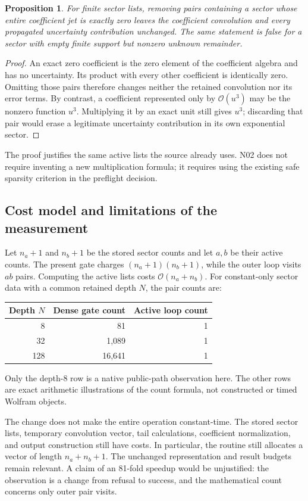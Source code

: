 \documentclass[11pt,a4paper]{article}
\newcommand{\OO}{\mathcal O}
\newtheorem{proposition}{Proposition}[section]
\begin{document}
\begin{proposition}
For finite sector lists, removing pairs containing a sector whose entire coefficient jet is exactly zero leaves the coefficient convolution and every propagated uncertainty contribution unchanged. The same statement is false for a sector with empty finite support but nonzero unknown remainder.
\end{proposition}
\begin{proof}
An exact zero coefficient is the zero element of the coefficient algebra and has no uncertainty. Its product with every other coefficient is identically zero. Omitting those pairs therefore changes neither the retained convolution nor its error terms. By contrast, a coefficient represented only by $\OO(u^3)$ may be the nonzero function $u^3$. Multiplying it by an exact unit still gives $u^3$; discarding that pair would erase a legitimate uncertainty contribution in its own exponential sector.
\end{proof}

The proof justifies the same active lists the source already uses. N02 does not require inventing a new multiplication formula; it requires using the existing safe sparsity criterion in the preflight decision.

\subsection{Cost model and limitations of the measurement}
Let $n_a+1$ and $n_b+1$ be the stored sector counts and let $a,b$ be their active counts. The present gate charges $(n_a+1)(n_b+1)$, while the outer loop visits $ab$ pairs. Computing the active lists costs $\OO(n_a+n_b)$. For constant-only sector data with a common retained depth $N$, the pair counts are:
\begin{center}
\begin{tabular}{@{}rrr@{}}\toprule
Depth $N$ & Dense gate count & Active loop count\\\midrule
8 & 81 & 1\\
32 & 1,089 & 1\\
128 & 16,641 & 1\\
\bottomrule\end{tabular}
\end{center}
Only the depth-8 row is a native public-path observation here. The other rows are exact arithmetic illustrations of the count formula, not constructed or timed Wolfram objects.

The change does not make the entire operation constant-time. The stored sector lists, temporary convolution vector, tail calculations, coefficient normalization, and output construction still have costs. In particular, the routine still allocates a vector of length $n_a+n_b+1$. The unchanged representation and result budgets remain relevant. A claim of an 81-fold speedup would be unjustified: the observation is a change from refusal to success, and the mathematical count concerns only outer pair visits.
\end{document}
